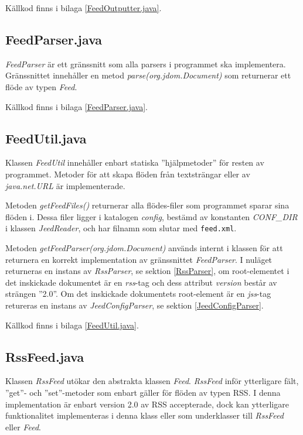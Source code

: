 \documentclass[titlepage, twoside, a4paper, 12pt]{article}
\begin{document}
Källkod finns i bilaga \ref{FeedOutputter.java}.

\subsection{FeedParser.java}\label{FeedParser}
\textit{FeedParser} är ett gränssnitt som alla parsers i programmet
ska implementera. Gränssnittet innehåller en metod
\textit{parse(org.jdom.Document)} som returnerar ett flöde av typen
\textit{Feed}.

Källkod finns i bilaga \ref{FeedParser.java}.

\subsection{FeedUtil.java}\label{FeedUtil}
Klassen \textit{FeedUtil} innehåller enbart statiska
''hjälp\-metoder'' för resten av programmet. Metoder för att skapa
flöden från textsträngar eller av \textit{java.net.URL} är
implementerade.

Metoden \textit{getFeedFiles()}\label{getFeedFiles()} returnerar alla
flödes-filer som programmet sparar sina flöden i. Dessa filer ligger i
katalogen \textit{config}, bestämd av konstanten \textit{CONF\_DIR} i
klassen \textit{JeedReader}, och har filnamn som slutar med
\verb!feed.xml!.

Metoden \textit{getFeedParser(org.jdom.Document)} används internt i
klassen för att returnera en korrekt implementation av gränssnittet
\textit{FeedParser}. I nuläget returneras en instans av
\textit{RssParser}, se sektion \ref{RssParser}, om root-elementet i
det inskickade dokumentet är en \textit{rss}-tag och dess attribut
\textit{version} består av strängen ''2.0''. Om det inskickade
dokumentets root-element är en \textit{jss}-tag retureras en instans
av \textit{JeedConfigParser}, se sektion \ref{JeedConfigParser}.

Källkod finns i bilaga \ref{FeedUtil.java}.

\subsection{RssFeed.java}\label{RssFeed}
Klassen \textit{RssFeed} utökar den abstrakta klassen
\textit{Feed}. \textit{RssFeed} inför ytterligare fält, ''get''- och
''set''-metoder som enbart gäller för flöden av typen RSS. I denna
implementation är enbart version 2.0 av RSS accepterade, dock kan
ytterligare funktionalitet implementeras i denna klass eller som
underklasser till \textit{RssFeed} eller \textit{Feed}.
\end{document}
